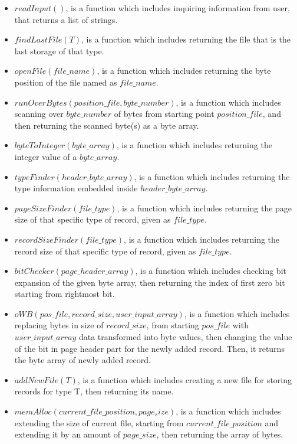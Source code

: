 \documentclass[12pt]{report}
\begin{document}
\begin{itemize}
\item $readInput()$, is a function which includes inquiring information from user, that returns a list of strings.
\item $findLastFile(T)$, is a function which includes returning the file that is the last storage of that type.
\item $openFile(file\_name)$, is a function which includes returning the byte position of the file named as $file\_name$.
\item $runOverBytes(position\_file, byte\_number)$, is a function which includes scanning over $byte\_number$ of bytes from starting point $position\_file$, and then returning the scanned byte(s) as a byte array.
\item $byteToInteger(byte\_array)$, is a function which includes returning the integer value of a $byte\_array$.
\item $typeFinder(header\_byte\_array)$, is a function which includes returning the type information embedded inside $header\_byte\_array$.
\item $pageSizeFinder(file\_type)$, is a function which includes returning the page size of that specific type of record, given as $file\_type$.
\item $recordSizeFinder(file\_type)$, is a function which includes returning the record size of that specific type of record, given as $file\_type$.
\item $bitChecker(page\_header\_array)$, is a function which includes checking bit expansion of the given byte array, then returning the index of first zero bit starting from rightmost bit.
\item $oWB(pos\_file, record\_size, user\_input\_array)$, is a function which includes replacing bytes in size of $record\_size$, from starting $pos\_file$ with \\ 
$user\_input\_array$ data transformed into byte values, then changing the value of the bit in page header part for the newly added record. Then, it returns the byte array of newly added record.
\item $addNewFile(T)$, is a function which includes creating a new file for storing records for type T, then returning its name.
\item $memAlloc(current\_file\_position, page_size)$, is a function which includes extending the size of current file, starting from $current\_file\_position$ and extending it by an amount of $page\_size$, then returning the array of bytes.
\end{itemize}
\end{document}
